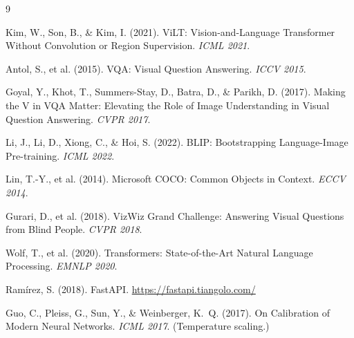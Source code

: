 \documentclass[12pt,a4paper]{article}
\begin{document}
\newpage
\begin{thebibliography}{9}

 Kim, W., Son, B., \& Kim, I. (2021). ViLT: Vision-and-Language Transformer Without Convolution or Region Supervision. \textit{ICML 2021}.

 Antol, S., et al. (2015). VQA: Visual Question Answering. \textit{ICCV 2015}.

 Goyal, Y., Khot, T., Summers-Stay, D., Batra, D., \& Parikh, D. (2017). Making the V in VQA Matter: Elevating the Role of Image Understanding in Visual Question Answering. \textit{CVPR 2017}.

 Li, J., Li, D., Xiong, C., \& Hoi, S. (2022). BLIP: Bootstrapping Language-Image Pre-training. \textit{ICML 2022}.

 Lin, T.-Y., et al. (2014). Microsoft COCO: Common Objects in Context. \textit{ECCV 2014}.

 Gurari, D., et al. (2018). VizWiz Grand Challenge: Answering Visual Questions from Blind People. \textit{CVPR 2018}.

 Wolf, T., et al. (2020). Transformers: State-of-the-Art Natural Language Processing. \textit{EMNLP 2020}.

 Ram\'irez, S. (2018). FastAPI. \url{https://fastapi.tiangolo.com/}

 Guo, C., Pleiss, G., Sun, Y., \& Weinberger, K.~Q. (2017). On Calibration of Modern Neural Networks. \textit{ICML 2017}. (Temperature scaling.)

\end{thebibliography}
\end{document}
